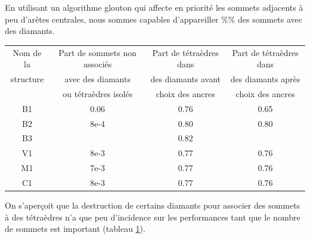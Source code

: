 \documentclass[a4paper,11pt,openany]{article}
\begin{document}
En utilisant un algorithme glouton qui affecte en priorité les sommets adjacents à peu d'arêtes centrales, nous sommes capables d'appareiller \%\% des sommets avec des diamants.
\begin{table}[H]
\footnotesize
\begin{tabular}{|c | c | c | c |}
\hline
Nom de la & Part de sommets non associés & Part de tétraèdres dans  & Part de tétraèdres dans \\
structure&avec des diamants  & des diamants avant & des diamants après \\
& ou tétraèdres isolés & choix des ancres& choix des ancres\\
\hline
B1 & 0.06 & 0.76 & 0.65 \\
B2 & 8e-4 & 0.80 & 0.80 \\
B3 &  & 0.82 & \\
V1 & 8e-3  & 0.77 & 0.76 \\
M1 & 7e-3 & 0.77 & 0.76\\
C1 & 8e-3 & 0.77 & 0.76 \\
\hline  
\end{tabular}
\label{Tab:results_ancres}
\end{table}

\begin{figure}[H]
\begin{center}
\end{center}
\end{figure}
\noindent
On s'aper\c coit que la destruction de certains diamants pour associer des sommets à des tétraèdres n'a que peu d'incidence sur les performances tant que le nombre de sommets est important (tableau \ref{Tab:results_ancres}).
\end{document}
